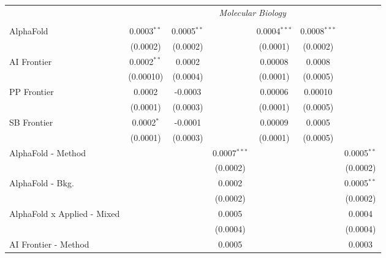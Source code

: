 \begin{tabular}{lcccccc}
 & \multicolumn{6}{c}{\textit{Molecular Biology}} \\ \\
   AlphaFold                     & 0.0003$^{**}$ & 0.0005$^{**}$ &                & 0.0004$^{***}$ & 0.0008$^{***}$ &   \\   
                                 & (0.0002)      & (0.0002)      &                & (0.0001)       & (0.0002)       &   \\   
   AI Frontier                   & 0.0002$^{**}$ & 0.0002        &                & 0.00008        & 0.0008         &   \\   
                                 & (0.00010)     & (0.0004)      &                & (0.0001)       & (0.0005)       &   \\   
   PP Frontier                   & 0.0002        & -0.0003       &                & 0.00006        & 0.00010        &   \\   
                                 & (0.0001)      & (0.0003)      &                & (0.0001)       & (0.0005)       &   \\   
   SB Frontier                   & 0.0002$^{*}$  & -0.0001       &                & 0.00009        & 0.0005         &   \\   
                                 & (0.0001)      & (0.0003)      &                & (0.0001)       & (0.0005)       &   \\   
   AlphaFold - Method            &               &               & 0.0007$^{***}$ &                &                & 0.0005$^{**}$\\   
                                 &               &               & (0.0002)       &                &                & (0.0002)\\   
   AlphaFold - Bkg.              &               &               & 0.0002         &                &                & 0.0005$^{**}$\\   
                                 &               &               & (0.0002)       &                &                & (0.0002)\\   
   AlphaFold x Applied - Mixed   &               &               & 0.0005         &                &                & 0.0004\\   
                                 &               &               & (0.0004)       &                &                & (0.0004)\\   
   AI Frontier - Method          &               &               & 0.0005         &                &                & 0.0003\\   

\end{tabular}

